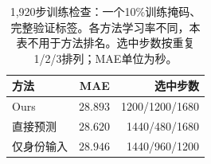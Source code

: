 \begin{table}[t]
\centering\footnotesize\setlength{\tabcolsep}{4pt}
\caption{1,920步训练检查：一个10\%训练掩码、完整验证标签。各方法学习率不同，本表不用于方法排名。选中步数按重复1/2/3排列；MAE单位为秒。}\label{tab:convergence}
\begin{tabular}{lrr}\toprule
方法 & MAE & 选中步数\\\midrule
Ours & $28.893$ & 1200/1200/1680\\
直接预测 & $28.620$ & 1440/480/1680\\
仅身份输入 & $28.946$ & 1440/960/1200\\
\bottomrule\end{tabular}
\end{table}
